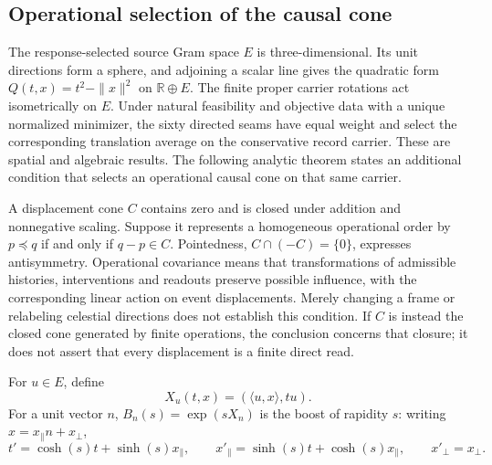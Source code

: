 \subsection{Operational selection of the causal cone}
\label{sec:operational-causal-selection}

The response-selected source Gram space $E$ is three-dimensional. Its unit
directions form a sphere, and adjoining a scalar line gives the quadratic
form $Q(t,x)=t^2-\|x\|^2$ on $\mathbb R\oplus E$. The finite proper carrier
rotations act isometrically on $E$. Under natural feasibility and objective
data with a unique normalized minimizer, the sixty directed seams have
equal weight and select the corresponding translation average on the
conservative record carrier. These are spatial and algebraic results.
The following analytic theorem states an additional condition that selects
an operational causal cone on that same carrier.

A displacement cone $C$ contains zero and is closed under addition and
nonnegative scaling. Suppose it represents a homogeneous operational order
by $p\preceq q$ if and only if $q-p\in C$. Pointedness,
$C\cap(-C)=\{0\}$, expresses antisymmetry. Operational covariance means
that transformations of admissible histories, interventions and readouts
preserve possible influence, with the corresponding linear action on
event displacements. Merely changing a frame or relabeling celestial
directions does not establish this condition. If $C$ is instead the closed
cone generated by finite operations, the conclusion concerns that closure;
it does not assert that every displacement is a finite direct read.

For $u\in E$, define
\[
 X_u(t,x)=(\langle u,x\rangle,tu).
\]
For a unit vector $n$, $B_n(s)=\exp(sX_n)$ is the boost of rapidity $s$:
writing $x=x_\parallel n+x_\perp$,
\[
 t'=\cosh(s)t+\sinh(s)x_\parallel,\qquad
 x'_\parallel=\sinh(s)t+\cosh(s)x_\parallel,\qquad
 x'_\perp=x_\perp.
\]

